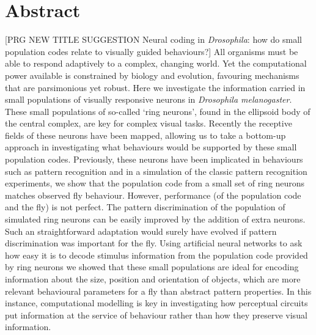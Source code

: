 \section*{Abstract}
[PRG NEW TITLE SUGGESTION Neural coding in \emph{Drosophila}: how do small population codes relate to visually guided behaviours?]
All organisms must be able to respond adaptively to a complex, changing world.
Yet the computational power available is constrained by biology and evolution, favouring mechanisms that are parsimonious yet robust.
Here we investigate the information carried in small populations of visually responsive neurons in \emph{Drosophila melanogaster}.
These small populations of so-called `ring neurons', found in the ellipsoid body of the central complex, are key for complex visual tasks.
Recently the receptive fields of these neurons have been mapped, allowing us to take a bottom-up approach in investigating what behaviours would be supported by these small population codes.
Previously, these neurons have been implicated in behaviours such as pattern recognition and in a simulation of the classic pattern recognition experiments, we show that the population code from a small set of ring neurons matches observed fly behaviour.
However, performance (of the population code and the fly) is not perfect.
The pattern discrimination of the population of simulated ring neurons can be easily improved by the addition of extra neurons.
Such an straightforward adaptation would surely have evolved if pattern discrimination was important for the fly.
Using artificial neural networks to ask how easy it is to decode stimulus information from the population code provided by ring neurons we showed that these small populations are ideal for encoding information about the size, position and orientation of objects, which are more relevant behavioural parameters for a fly than abstract pattern properties.
In this instance, computational modelling is key in investigating how perceptual circuits put information at the service of behaviour rather than how they preserve visual information.